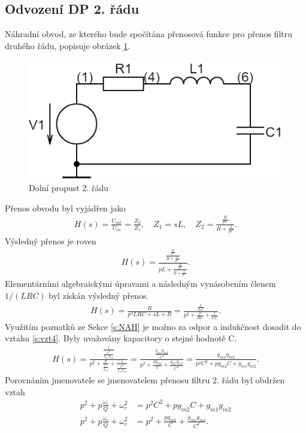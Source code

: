 \subsection{Odvození DP 2. řádu}\label{s:ODV}
\noindent Náhradní obvod, ze kterého bude spočítána přenosová funkce pro přenos filtru druhého řádu, popisuje obrázek \ref{s:DPO}.
\begin{figure}[h]
\centering
\includegraphics[scale=0.4]{circuit(2).png}
\caption{Dolní propust 2. řádu \label{s:DPO}} 
\end{figure}
\noindent Přenos obvodu byl vyjádřen jako
\begin{align}
H(s) = \frac{U_{out}}{U_{in}} = \frac{Z_2}{Z_1}, \quad Z_1 = sL,\quad Z_2 = \frac{\frac{R}{pC}}{R + \frac{1}{pC}}.
\end{align}
Výsledný přenos je roven 
\begin{align}
H(s) = \frac{\frac{\frac{R}{pC}}{R + \frac{1}{pC}}}{pL + \frac{\frac{R}{pC}}{R + \frac{1}{pC}}}.
\end{align}
Elementárními algebraickými úpravami a následným vynásobením členem $1/(LRC)$ byl získán výsledný přenos.
\begin{align}\label{s:vzt4}
H(s) = \frac{R}{p^2LRC + sL + R} = \frac{\frac{1}{LC}}{p^2 + \frac{p}{RC} + \frac{1}{LC}}.
\end{align}
\noindent Využitím poznatků ze Sekce \ref{s:NAH} je možno za odpor a indukčnost dosadit do vztahu \ref{s:vzt4}. Byly uvažovány kapacitory o stejné hodnotě C.
\begin{align}
H(s) = \frac{\frac{1}{\frac{C^2}{g_{m1}g_{m2}}}}{p^2 + \frac{p}{\frac{C}{g_{m2}}} + \frac{1}{\frac{C^2}{g_{m1}g_{m2}}}} = \frac{\frac{g_{m1}g_{m2}}{C^2}}{p^2 + \frac{pg_{m2}}{C} + \frac{g_{m1}g_{m2}}{C^2}} = \frac{g_{m1}g_{m2}}{p^2C^2 + pg_{m2}C + g_{m1}g_{m2}}.
\end{align}
Porovnáním jmenovatele se jmenovatelem přenosu filtru 2. řádu byl obdržen vztah
\begin{align}
p^2 + p\frac{\omega _c}{Q} + \omega _c^2 &= p^2C^2 + pg_{m2}C + g_{m1}g_{m2}\\
p^2 + p\frac{\omega _c}{Q} + \omega _c^2 &= p^2 + \frac{pg_{m2}}{C} + \frac{g_{m1}g_{m2}}{C^2}.
\end{align}
